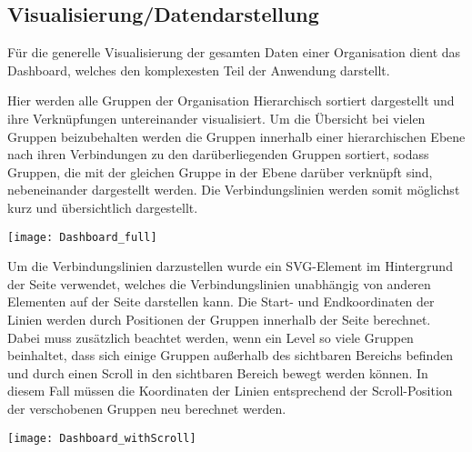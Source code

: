 \subsection{Visualisierung/Datendarstellung}
Für die generelle Visualisierung der gesamten Daten einer Organisation dient das Dashboard, welches den komplexesten Teil der Anwendung darstellt.

Hier werden alle Gruppen der Organisation Hierarchisch sortiert dargestellt und ihre Verknüpfungen untereinander visualisiert.
Um die Übersicht bei vielen Gruppen beizubehalten werden die Gruppen innerhalb einer hierarchischen Ebene nach ihren Verbindungen zu den darüberliegenden Gruppen sortiert, sodass Gruppen, die mit der gleichen Gruppe in der Ebene darüber verknüpft sind, nebeneinander dargestellt werden. Die Verbindungslinien werden somit möglichst kurz und übersichtlich dargestellt.

\vspace{20pt}
\begin{center}
    \begin{minipage}{1\linewidth}
        \texttt{[image: Dashboard\_full]}
    \end{minipage}
\end{center}
\vspace{20pt}

Um die Verbindungslinien darzustellen wurde ein SVG-Element im Hintergrund der Seite verwendet, welches die Verbindungslinien unabhängig von anderen Elementen auf der Seite darstellen kann. Die Start- und Endkoordinaten der Linien werden durch Positionen der Gruppen innerhalb der Seite berechnet. Dabei muss zusätzlich beachtet werden, wenn ein Level so viele Gruppen beinhaltet, dass sich einige Gruppen außerhalb des sichtbaren Bereichs befinden und durch einen Scroll in den sichtbaren Bereich bewegt werden können. In diesem Fall müssen die Koordinaten der Linien entsprechend der Scroll-Position der verschobenen Gruppen neu berechnet werden.

\vspace{20pt}
\begin{center}
    \begin{minipage}{1\linewidth}
        \texttt{[image: Dashboard\_withScroll]}
    \end{minipage}
\end{center}
\vspace{20pt}

